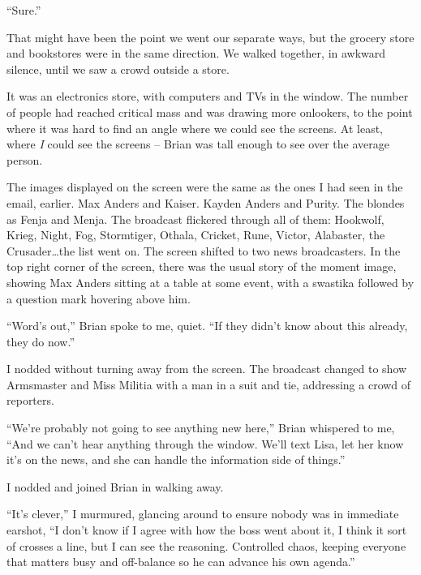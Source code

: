 ``Sure.''



That might have been the point we went our separate ways, but the grocery store and bookstores were in the same direction.  We walked together, in awkward silence, until we saw a crowd outside a store.



It was an electronics store, with computers and TVs in the window.  The number of people had reached critical mass and was drawing more onlookers, to the point where it was hard to find an angle where we could see the screens.  At least, where \emph{I} could see the screens – Brian was tall enough to see over the average person.



The images displayed on the screen were the same as the ones I had seen in the email, earlier.  Max Anders and Kaiser.  Kayden Anders and Purity.  The blondes as Fenja and Menja.  The broadcast flickered through all of them: Hookwolf, Krieg, Night, Fog, Stormtiger, Othala, Cricket, Rune, Victor, Alabaster, the Crusader\ldots the list went on.  The screen shifted to two news broadcasters.  In the top right corner of the screen, there was the usual story of the moment image, showing Max Anders sitting at a table at some event, with a swastika followed by a question mark hovering above him.



``Word's out,'' Brian spoke to me, quiet.  ``If they didn't know about this already, they do now.''



I nodded without turning away from the screen.  The broadcast changed to show Armsmaster and Miss Militia with a man in a suit and tie, addressing a crowd of reporters.



``We're probably not going to see anything new here,'' Brian whispered to me, ``And we can't hear anything through the window.  We'll text Lisa, let her know it's on the news, and she can handle the information side of things.''



I nodded and joined Brian in walking away.



``It's clever,'' I murmured, glancing around to ensure nobody was in immediate earshot, ``I don't know if I agree with how the boss went about it, I think it sort of crosses a line, but I can see the reasoning.  Controlled chaos, keeping everyone that matters busy and off-balance so he can advance his own agenda.''



